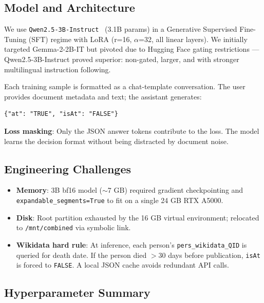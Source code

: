 \documentclass{ceurart}
\begin{document}
\subsection{Model and Architecture}

We use \texttt{Qwen2.5-3B-Instruct}~\cite{qwen25} (3.1B params) in a Generative Supervised Fine-Tuning (SFT) regime with LoRA (r=16, $\alpha$=32, all linear layers). We initially targeted Gemma-2-2B-IT but pivoted due to Hugging Face gating restrictions --- Qwen2.5-3B-Instruct proved superior: non-gated, larger, and with stronger multilingual instruction following.

Each training sample is formatted as a chat-template conversation. The user provides document metadata and text; the assistant generates:
\begin{lstlisting}
{"at": "TRUE", "isAt": "FALSE"}
\end{lstlisting}
\textbf{Loss masking}: Only the JSON answer tokens contribute to the loss. The model learns the decision format without being distracted by document noise.

\subsection{Engineering Challenges}

\begin{itemize}
  \item \textbf{Memory}: 3B bf16 model ($\sim$7 GB) required gradient checkpointing and \texttt{expandable\_segments=True} to fit on a single 24 GB RTX A5000.
  \item \textbf{Disk}: Root partition exhausted by the 16 GB virtual environment; relocated to \texttt{/mnt/combined} via symbolic link.
  \item \textbf{Wikidata hard rule}: At inference, each person's \texttt{pers\_wikidata\_QID} is queried for death date. If the person died $>$30 days before publication, \texttt{isAt} is forced to \texttt{FALSE}. A local JSON cache avoids redundant API calls.
\end{itemize}

\subsection{Hyperparameter Summary}
\end{document}
